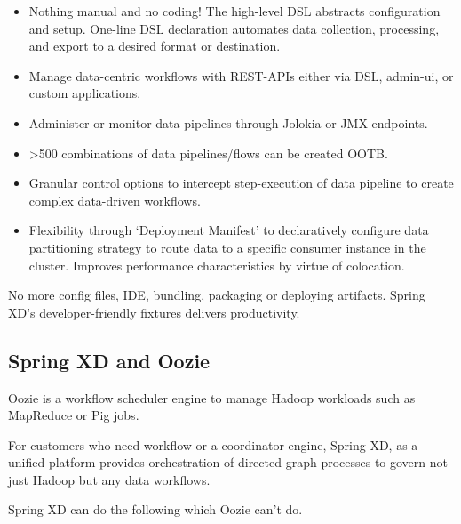 \begin{itemize}
\item Nothing manual and no coding! The high-level DSL abstracts configuration and setup. One-line DSL declaration automates data collection, processing, and export to a desired format or destination.
\item Manage data-centric workflows with REST-APIs either via DSL, admin-ui, or custom applications.
\item Administer or monitor data pipelines through Jolokia or JMX endpoints. 
\item >500 combinations of data pipelines/flows can be created OOTB.
\item Granular control options to intercept step-execution of data pipeline to create complex data-driven workflows.
\item Flexibility through `Deployment Manifest' to declaratively configure data partitioning strategy to route data to a specific consumer instance in the cluster. Improves performance characteristics by virtue of colocation.
\end{itemize}

No more config files, IDE, bundling, packaging or deploying artifacts. Spring XD's developer-friendly fixtures delivers productivity. 

\subsection{Spring XD and Oozie}
Oozie is a workflow scheduler engine to manage Hadoop workloads such as MapReduce or Pig jobs. 

For customers who need workflow or a coordinator engine, Spring XD, as a unified platform provides orchestration of directed graph processes to govern not just Hadoop but any data workflows. 

Spring XD can do the following which Oozie can't do.


